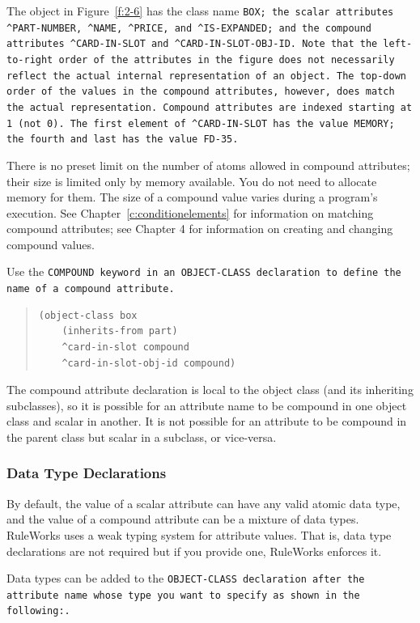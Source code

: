 The object in Figure~\ref{f:2-6} has the class name \tt{BOX}; the scalar
attributes \verb|^PART-NUMBER|, \verb|^NAME|, \verb|^PRICE|, and
\verb|^IS-EXPANDED|; and the compound attributes \verb|^CARD-IN-SLOT|
and \verb|^CARD-IN-SLOT-OBJ-ID|. Note that the left-to-right order of
the attributes in the figure does not necessarily reflect the actual
internal representation of an object. The top-down order of the values
in the compound attributes, however, does match the actual
representation. Compound attributes are indexed starting at 1 (not
0). The first element of \verb|^CARD-IN-SLOT| has the value
\verb|MEMORY|; the fourth and last has the value \verb|FD-35|.

There is no preset limit on the number of atoms allowed in compound
attributes; their size is limited only by memory available. You do not
need to allocate memory for them. The size of a compound value varies
during a program's execution.  See Chapter~\ref{c:conditionelements}
for information on matching compound attributes; see Chapter 4 for
information on creating and changing compound values.

Use the \tt{COMPOUND} keyword in an \tt{OBJECT-CLASS} declaration to
define the name of a compound attribute.
\begin{quote}
\begin{verbatim}
(object-class box
    (inherits-from part)
    ^card-in-slot compound
    ^card-in-slot-obj-id compound)
\end{verbatim}
\end{quote}

The compound attribute declaration is local to the object
class (and its inheriting subclasses), so it is possible for
an attribute name to be compound in one object class and
scalar in another. It is not possible for an attribute to be
compound in the parent class but scalar in a subclass, or
vice-versa.

\subsubsection{Data Type Declarations}

By default, the value of a scalar attribute can have any
valid atomic data type, and the value of a compound attribute
can be a mixture of data types. RuleWorks uses a weak typing
system for attribute values. That is, data type declarations
are not required but if you provide one, RuleWorks enforces
it.

Data types can be added to the \tt{OBJECT-CLASS} declaration after
the attribute name whose type you want to specify as shown in
the following:.

